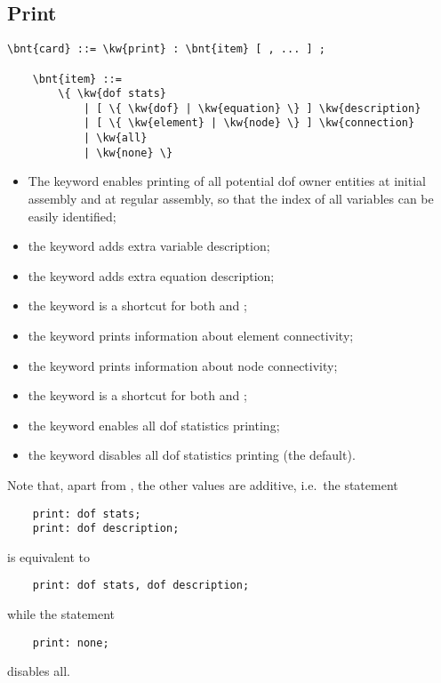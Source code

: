 \subsection{Print}\label{sec:CONTROLDATA:PRINT}
\begin{Verbatim}[commandchars=\\\{\}]
    \bnt{card} ::= \kw{print} : \bnt{item} [ , ... ] ;

    \bnt{item} ::=
        \{ \kw{dof stats}
            | [ \{ \kw{dof} | \kw{equation} \} ] \kw{description}
            | [ \{ \kw{element} | \kw{node} \} ] \kw{connection}
            | \kw{all}
            | \kw{none} \}
\end{Verbatim}
\begin{itemize}
\item The keyword  enables printing of all potential
	dof owner entities at initial assembly and at regular assembly,
	so that the index of all variables can be easily identified;
\item the keyword  adds extra variable description;
\item the keyword  adds extra equation description;
\item the keyword  is a shortcut for both
	 and ;
\item the keyword  prints information
	about element connectivity;
\item the keyword  prints information
	about node connectivity;
\item the keyword  is a shortcut for both
	 and ;
\item the keyword  enables all dof statistics printing;
\item the keyword  disables all dof statistics printing
	(the default).
\end{itemize}
Note that, apart from , the other values are additive,
i.e.\ the statement
\begin{verbatim}
    print: dof stats;
    print: dof description;
\end{verbatim}
is equivalent to 
\begin{verbatim}
    print: dof stats, dof description;
\end{verbatim}
while the statement
\begin{verbatim}
    print: none;
\end{verbatim}
disables all.

